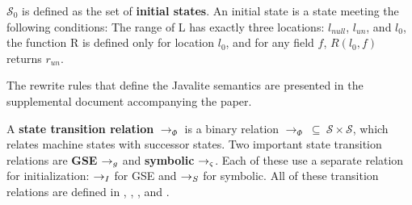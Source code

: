 \begin{definition}
\label{def:initstate}
$\mathcal{S}_0$ is defined as the set of \textbf{initial states}. An initial state is a state meeting the following conditions:  The range of L has exactly three locations: $l_{null}$, $l_{un}$, and $l_0$, the function R is defined only for location $l_0$, and for any field $f$, $R(l_0,f)$ returns $r_{un}$. 
\end{definition}

The rewrite rules that define the Javalite semantics are presented in
the supplemental document accompanying the paper.

\begin{definition}
A \textbf{state transition relation} $\rightarrow_{\Phi}$ is a binary relation $\rightarrow_{\Phi}\ \subseteq\ \mathcal{S} \times \mathcal{S} $, which relates machine states with successor states. Two important state transition relations are \textbf{GSE} $\rightarrow_{g}$ and \textbf{symbolic} $\rightarrow_{\varsigma}$. Each of these use a separate relation for initialization: $\rightarrow_I$ for GSE and $\rightarrow_S$ for symbolic. All of these transition relations are defined in , , , and .
\end{definition}
